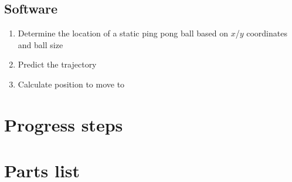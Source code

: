 \documentclass[letterpaper, 11pt]{article}
\begin{document}
\subsection*{Software}
\begin{enumerate}[label=\textbf{(\arabic*)}]
    \item Determine the location of a static ping pong ball based on $x$/$y$ coordinates and ball size
    \item Predict the trajectory
    \item Calculate position to move to
\end{enumerate}

\section{Progress steps}

\section{Parts list}
\end{document}
